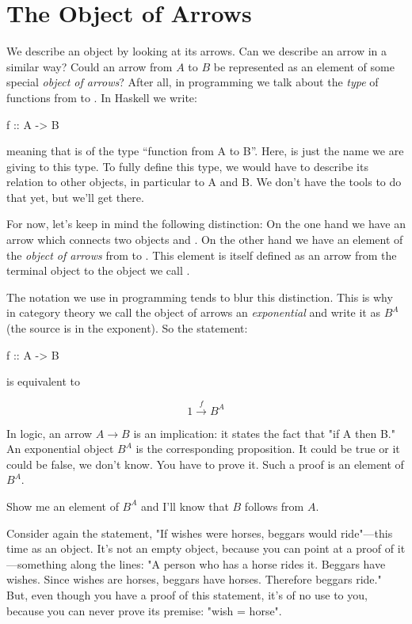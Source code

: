 \documentclass[DaoFP]{subfiles}
\begin{document}
\section{The Object of Arrows}

We describe an object by looking at its arrows. Can we describe an arrow in a similar way? Could an arrow from $A$ to $B$ be represented as an element of some special \emph{object of arrows}? After all, in programming we talk about the \emph{type} of functions from  to . In Haskell we write:
\begin{haskell}
f :: A -> B
\end{haskell}
meaning that  is of the type ``function from A to B''. Here,  is just the name we are giving to this type. To fully define this type, we would have to describe its relation to other objects, in particular to A and B. We don't have the tools to do that yet, but we'll get there. 

For now, let's keep in mind the following distinction: On the one hand we have an arrow which connects two objects  and . On the other hand we have an element of the \emph{object of arrows} from   to . This element is itself defined as an arrow from the terminal object \hask{()} to the object we call . 

The notation we use in programming tends to blur this distinction. This is why in category theory we call the object of arrows an \emph{exponential} and write it as $ B^A$ (the source is in the exponent). So the statement:
\begin{haskell}
f :: A -> B
\end{haskell}
is equivalent to

\[ 1 \xrightarrow f B^A\]

In logic, an arrow $ A \to B$ is an implication: it states the fact that "if A then B." An exponential object $ B^A$ is the corresponding proposition. It could be true or it could be false, we don't know. You have to prove it. Such a proof is an element of $ B^A$. 

Show me an element of $ B^A$ and I'll know that $ B$ follows from $ A$.

Consider again the statement, "If wishes were horses, beggars would ride"---this time as an object. It's not an empty object, because you can point at a proof of it---something along the lines: "A person who has a horse rides it. Beggars have wishes. Since wishes are horses, beggars have horses. Therefore beggars ride." But, even though you have a proof of this statement, it's of no use to you, because you can never prove its premise: "wish = horse". 
\end{document}
